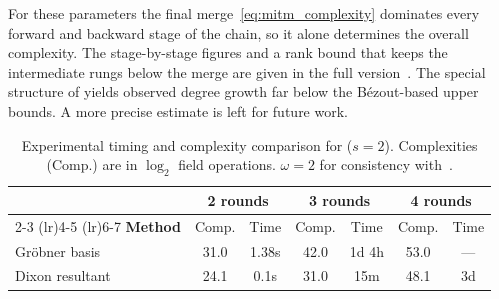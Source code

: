For these parameters the final merge~\eqref{eq:mitm_complexity} dominates every forward and backward stage of the chain, so it alone determines the overall complexity. The stage-by-stage figures and a rank bound that keeps the intermediate rungs below the merge are given in the full version~\cite{cryptoeprint:2026/1969}. The special structure of \vision yields observed degree growth far below the B\'ezout-based upper bounds. A more precise estimate is left for future work.

\begin{table}[h]
\centering
\caption{Experimental timing and complexity comparison for \vision ($s=2$). Complexities (Comp.) are in $\log_2$ field operations. $\omega = 2$ for consistency with~\cite{DBLP:conf/asiacrypt/LiuMM24}.}
\label{tab:vision_timing}
\setlength{\tabcolsep}{6pt}
\renewcommand{\arraystretch}{1.2}
\begin{tabular}{lcccccc}
\toprule
& \multicolumn{2}{c}{\textbf{2 rounds}} & \multicolumn{2}{c}{\textbf{3 rounds}} & \multicolumn{2}{c}{\textbf{4 rounds}} \\
\cmidrule(lr){2-3} \cmidrule(lr){4-5} \cmidrule(lr){6-7}
\textbf{Method} & Comp. & Time & Comp. & Time & Comp. & Time \\
\midrule
Gr\"obner basis~\cite{DBLP:conf/asiacrypt/LiuMM24} & 31.0 & 1.38s & 42.0 & 1d 4h & 53.0 & --- \\
Dixon resultant & 24.1 & 0.1s & 31.0 & 15m & 48.1 & 3d \\
\bottomrule
\end{tabular}
\end{table}

